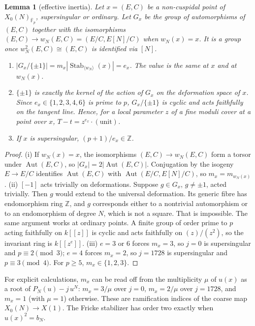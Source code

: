 \documentclass[11pt,a4paper]{article}
\numberwithin{equation}{section}
\newtheorem{lemma}[theorem]{Lemma}
\theoremstyle{definition}
\theoremstyle{remark}
\newcommand{\Fb}{\overline{\mathbb F}_p}
\newcommand{\Z}{\mathbb Z}
\newcommand{\Aut}{\operatorname{Aut}}
\newcommand{\Stab}{\operatorname{Stab}}
\begin{document}
\begin{lemma}[effective inertia]\label{lem:inertia}
Let $x=(E,C)$ be a non-cuspidal point of $X_0(N)_{\Fb}$, supersingular or ordinary. Let $G_x$ be the group of automorphisms
of $(E,C)$ together with the isomorphisms $(E,C)\to w_N(E,C)=(E/C,E[N]/C)$ when $w_N(x)=x$. It is a group once
$w_N^2(E,C)\cong(E,C)$ is identified via $[N]$.
\begin{enumerate}[label=\textup{(\roman*)}]
\item $|G_x/\{\pm1\}|=m_x|\Stab_{\langle w_N\rangle}(x)|=e_x$. The value is the same at $x$ and at $w_N(x)$.
\item $\{\pm1\}$ is exactly the kernel of the action of $G_x$ on the deformation space of $x$. Since
$e_x\in\{1,2,3,4,6\}$ is prime to $p$, $G_x/\{\pm1\}$ is cyclic and acts faithfully on the tangent line.
Hence, for a local parameter $z$ of a fine moduli cover at a point over $x$, $T-t=z^{e_x}\cdot(\text{unit})$.
\item If $x$ is supersingular, $(p+1)/e_x\in\Z$.
\end{enumerate}
\end{lemma}
\begin{proof}
(i) If $w_N(x)=x$, the isomorphisms $(E,C)\to w_N(E,C)$ form a torsor under $\Aut(E,C)$, so
$|G_x|=2|\Aut(E,C)|$. Conjugation by the isogeny $E\to E/C$ identifies $\Aut(E,C)$ with
$\Aut(E/C,E[N]/C)$, so $m_x=m_{w_N(x)}$.
(ii) $[-1]$ acts trivially on deformations. Suppose $g\in G_x$, $g\ne\pm1$, acted trivially. Then $g$
would extend to the universal deformation. Its generic fibre has endomorphism ring $\Z$, and $g$
corresponds either to a nontrivial automorphism or to an endomorphism of degree $N$, which is not a square.
That is impossible. The same argument works at ordinary points. A finite group of order prime to $p$ acting faithfully on $k[[z]]$ is cyclic and
acts faithfully on $(z)/(z^2)$, so the invariant ring is $k[[z^{e}]]$.
(iii) $e=3$ or $6$ forces $m_x=3$, so $j=0$ is supersingular and $p\equiv2\pmod3$; $e=4$ forces
$m_x=2$, so $j=1728$ is supersingular and $p\equiv3\pmod4$. For $p\ge5$, $m_x\in\{1,2,3\}$.
\end{proof}

For explicit calculations, $m_x$ can be read off from the multiplicity $\mu$ of $u(x)$ as a root of
$P_N(u)-j\,u^N$: $m_x=3/\mu$ over $j=0$, $m_x=2/\mu$ over $j=1728$, and $m_x=1$ (with $\mu=1$) otherwise.
These are ramification indices of the coarse map $X_0(N)\to X(1)$.
The Fricke stabilizer has order two exactly when $u(x)^2=b_N$.
\end{document}
